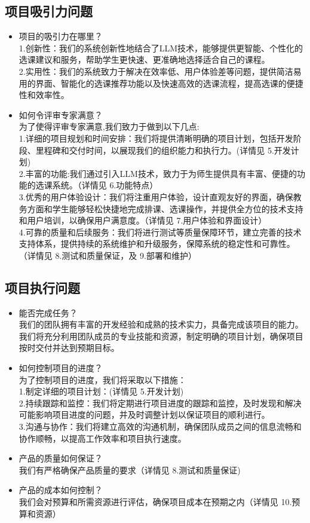 \documentclass{article}
\begin{document}
\subsection{项目吸引力问题}
\begin{itemize}
	\item 项目的吸引力在哪里？\\
	1.创新性：我们的系统创新性地结合了LLM技术，能够提供更智能、个性化的选课建议和服务，帮助学生更快速、更准确地选择适合自己的课程。\\
	2.实用性：我们的系统致力于解决在效率低、用户体验差等问题，提供简洁易用的界面、智能化的选课推荐功能以及快速高效的选课流程，提高选课的便捷性和效率性。\\
	\item 如何令评审专家满意？\\
	为了使得评审专家满意,我们致力于做到以下几点:\\
	1.详细的项目规划和时间安排：我们将提供清晰明确的项目计划，包括开发阶段、里程碑和交付时间，以展现我们的组织能力和执行力。(详情见 5.开发计划)\\
	2.丰富的功能:我们通过引入LLM技术，致力于为师生提供具有丰富、便捷的功能的选课系统。（详情见 6.功能特点）\\
	3.优秀的用户体验设计：我们将注重用户体验，设计直观友好的界面，确保教务方面和学生能够轻松快捷地完成排课、选课操作，并提供全方位的技术支持和用户培训，以确保用户满意度。（详情见 7.用户体验和界面设计）\\
	4.可靠的质量和后续服务：我们将进行测试等质量保障环节，建立完善的技术支持体系，提供持续的系统维护和升级服务，保障系统的稳定性和可靠性。（详情见 8.测试和质量保证，及 9.部署和维护）\\
\end{itemize}

\subsection{项目执行问题}
\begin{itemize}
	\item 能否完成任务？\\
	我们的团队拥有丰富的开发经验和成熟的技术实力，具备完成该项目的能力。我们将充分利用团队成员的专业技能和资源，制定明确的项目计划，确保项目按时交付并达到预期目标。
	\item 如何控制项目的进度？\\
	为了控制项目的进度，我们将采取以下措施：\\
	1.制定详细的项目计划：(详情见 5.开发计划)\\
	2.持续跟踪和监控：我们将定期进行项目进度的跟踪和监控，及时发现和解决可能影响项目进度的问题，并及时调整计划以保证项目的顺利进行。\\
	3.沟通与协作：我们将建立高效的沟通机制，确保团队成员之间的信息流畅和协作顺畅，以提高工作效率和项目执行速度。\\
	\item 产品的质量如何保证？\\
	我们有严格确保产品质量的要求（详情见 8.测试和质量保证)
	\item 产品的成本如何控制？\\
	我们会对预算和所需资源进行评估，确保项目成本在预期之内（详情见 10.预算和资源）
\end{itemize}
\end{document}
